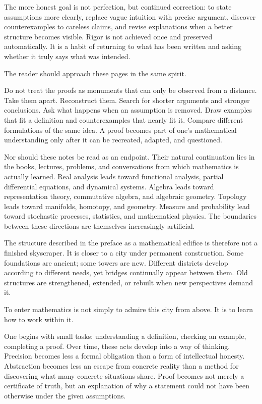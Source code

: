 The more honest goal is not perfection, but continued correction: to state assumptions more clearly, replace vague intuition with precise argument, discover counterexamples to careless claims, and revise explanations when a better structure becomes visible. Rigor is not achieved once and preserved automatically. It is a habit of returning to what has been written and asking whether it truly says what was intended.

The reader should approach these pages in the same spirit.

Do not treat the proofs as monuments that can only be observed from a distance. Take them apart. Reconstruct them. Search for shorter arguments and stronger conclusions. Ask what happens when an assumption is removed. Draw examples that fit a definition and counterexamples that nearly fit it. Compare different formulations of the same idea. A proof becomes part of one's mathematical understanding only after it can be recreated, adapted, and questioned.

Nor should these notes be read as an endpoint. Their natural continuation lies in the books, lectures, problems, and conversations from which mathematics is actually learned. Real analysis leads toward functional analysis, partial differential equations, and dynamical systems. Algebra leads toward representation theory, commutative algebra, and algebraic geometry. Topology leads toward manifolds, homotopy, and geometry. Measure and probability lead toward stochastic processes, statistics, and mathematical physics. The boundaries between these directions are themselves increasingly artificial.

The structure described in the preface as a mathematical edifice is therefore not a finished skyscraper. It is closer to a city under permanent construction. Some foundations are ancient; some towers are new. Different districts develop according to different needs, yet bridges continually appear between them. Old structures are strengthened, extended, or rebuilt when new perspectives demand it.

To enter mathematics is not simply to admire this city from above. It is to learn how to work within it.

One begins with small tasks: understanding a definition, checking an example, completing a proof. Over time, these acts develop into a way of thinking. Precision becomes less a formal obligation than a form of intellectual honesty. Abstraction becomes less an escape from concrete reality than a method for discovering what many concrete situations share. Proof becomes not merely a certificate of truth, but an explanation of why a statement could not have been otherwise under the given assumptions.

